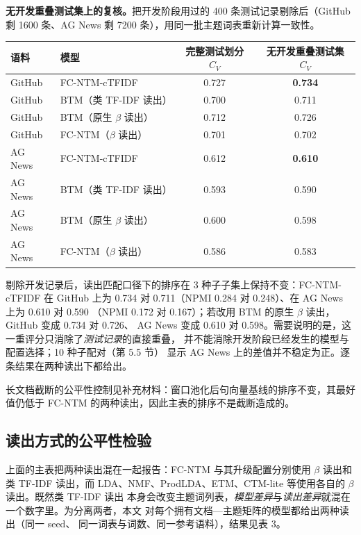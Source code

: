 \documentclass{article}
\begin{document}
\textbf{无开发重叠测试集上的复核。}把开发阶段用过的 400 条测试记录剔除后（GitHub 剩 1600 条、AG News 剩 7200 条），用同一批主题词表重新计算一致性。
\begin{center}
\small
\setlength{\tabcolsep}{4pt}
\begin{tabular}{@{}llcc@{}}
\toprule
语料 & 模型 & 完整测试划分 $C_V$ & 无开发重叠测试集 $C_V$ \\
\midrule
GitHub & FC-NTM-cTFIDF & 0.727 & \textbf{0.734} \\
GitHub & BTM（类 TF-IDF 读出） & 0.700 & 0.711 \\
GitHub & BTM（原生 $\beta$ 读出） & 0.712 & 0.726 \\
GitHub & FC-NTM（$\beta$ 读出） & 0.701 & 0.702 \\
\midrule
AG News & FC-NTM-cTFIDF & 0.612 & \textbf{0.610} \\
AG News & BTM（类 TF-IDF 读出） & 0.593 & 0.590 \\
AG News & BTM（原生 $\beta$ 读出） & 0.600 & 0.598 \\
AG News & FC-NTM（$\beta$ 读出） & 0.586 & 0.583 \\
\bottomrule
\end{tabular}
\end{center}
剔除开发记录后，读出匹配口径下的排序在 3 种子子集上保持不变：FC-NTM-cTFIDF 在 GitHub
上为 0.734 对 0.711（NPMI 0.284 对 0.248）、在 AG News 上为 0.610 对 0.590
（NPMI 0.172 对 0.167）；若改用 BTM 的原生 $\beta$ 读出，GitHub 变成 0.734 对 0.726、
AG News 变成 0.610 对 0.598。需要说明的是，这一重评分只消除了\emph{测试记录}的直接重叠，
并不能消除开发阶段已经发生的模型与配置选择；10 种子配对（第 5.5 节）
显示 AG News 上的差值并不稳定为正。逐条结果在两种读出下都给出。

长文档截断的公平性控制见补充材料：窗口池化后句向量基线的排序不变，其最好值仍低于
FC-NTM 的两种读出，因此主表的排序不是截断造成的。

\subsection{读出方式的公平性检验}
\label{sec:fair-readout}

上面的主表把两种读出混在一起报告：FC-NTM 与其升级配置分别使用 $\beta$ 读出和类 TF-IDF
读出，而 LDA、NMF、ProdLDA、ETM、CTM-lite 等使用各自的 $\beta$ 读出。既然类 TF-IDF 读出
本身会改变主题词列表，\emph{模型差异}与\emph{读出差异}就混在一个数字里。为分离两者，本文
对每个拥有文档—主题矩阵的模型都给出两种读出（同一 seed、
同一词表与词数、同一参考语料），结果见表 3。
\end{document}
